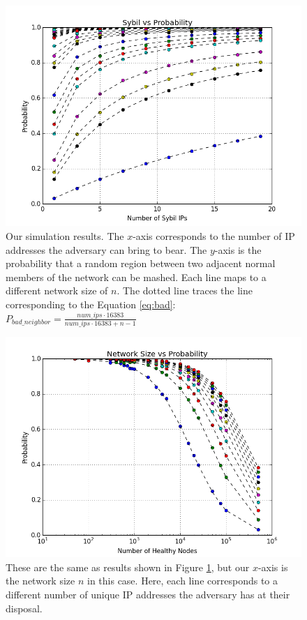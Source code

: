 \documentclass[11pt,conference]{IEEEtran}
\begin{document}
\begin{figure}
\centering
\includegraphics[width=1\linewidth]{ip_prob_all}
\caption[foo]{Our simulation results.  
    The $x$-axis corresponds to the number of IP addresses the adversary can bring to bear.
    The $y$-axis is the probability that a random region between two adjacent normal members of the network can be mashed.
    Each line maps to a different network size of $n$.
    The dotted line traces the line corresponding to the Equation \ref{eq:bad}: $ P_{bad\_neighbor} =  \frac{num\_ips \cdot 16383}{num\_ips \cdot 16383 + n - 1}$}
\label{fig:exp2}
\end{figure}


\begin{figure}
\centering
\includegraphics[width=\linewidth]{size_prob_all}
\caption[a]{These are the same as results shown in Figure \ref{fig:exp2}, but our $x$-axis is the network size $n$ in this case.  
    Here, each line corresponds to a different number of unique IP addresses the adversary has at their disposal.}
\label{fig:size_prob_all}
\end{figure}
\end{document}
